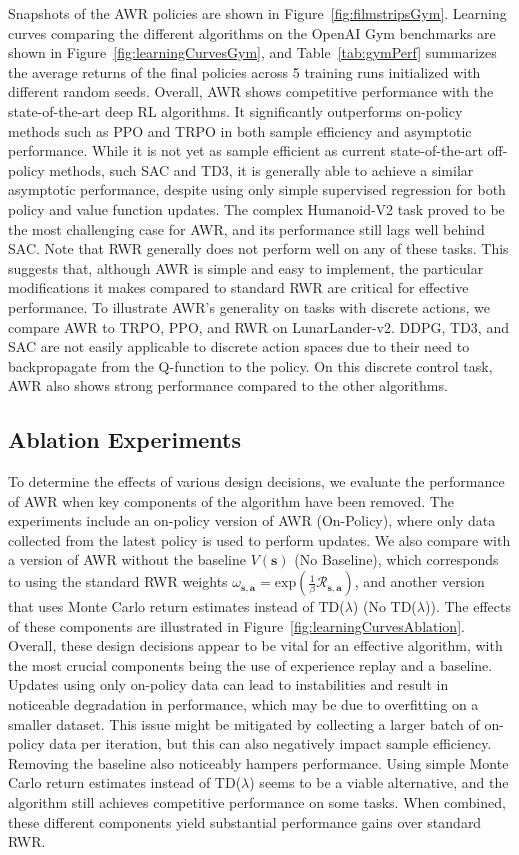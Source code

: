 Snapshots of the AWR policies are shown in Figure~\ref{fig:filmstripsGym}. Learning curves comparing the different algorithms on the OpenAI Gym benchmarks are shown in Figure~\ref{fig:learningCurvesGym}, and Table~\ref{tab:gymPerf} summarizes the average returns of the final policies across 5 training runs initialized with different random seeds. Overall, AWR shows competitive performance with the state-of-the-art deep RL algorithms. It significantly outperforms on-policy methods such as PPO and TRPO in both sample efficiency and asymptotic performance. While it is not yet as sample efficient as current state-of-the-art off-policy methods, such SAC and TD3, it is generally able to achieve a similar asymptotic performance, despite using only simple supervised regression for both policy and value function updates. The complex Humanoid-V2 task proved to be the most challenging case for AWR, and its performance still lags well behind SAC. Note that RWR generally does not perform well on any of these tasks. This suggests that, although AWR is simple and easy to implement, the particular modifications it makes compared to standard RWR are critical for effective performance. To illustrate AWR's generality on tasks with discrete actions, we compare AWR to TRPO, PPO, and RWR on LunarLander-v2. DDPG, TD3, and SAC are not easily applicable to discrete action spaces due to their need to backpropagate from the Q-function to the policy. On this discrete control task, AWR also shows strong performance compared to the other algorithms.

\subsection{Ablation Experiments} To determine the effects of various design decisions, we evaluate the performance of AWR when key components of the algorithm have been removed. The experiments include an on-policy version of AWR (On-Policy), where only data collected from the latest policy is used to perform updates. We also compare with a version of AWR without the baseline $V({\mathbf{s}})$ (No Baseline), which corresponds to using the standard RWR weights ${\omega_{{\mathbf{s}}, {\mathbf{a}}} = \mathrm{exp}(\frac{1}{\beta}\mathcal{R}_{{\mathbf{s}}, {\mathbf{a}}})}$, and another version that uses Monte Carlo return estimates instead of TD($\lambda$) (No TD($\lambda$)). The effects of these components are illustrated in Figure~\ref{fig:learningCurvesAblation}. Overall, these design decisions appear to be vital for an effective algorithm, with the most crucial components being the use of experience replay and a baseline. Updates using only on-policy data can lead to instabilities and result in noticeable degradation in performance, which may be due to overfitting on a smaller dataset. This issue might be mitigated by collecting a larger batch of on-policy data per iteration, but this can also negatively impact sample efficiency. Removing the baseline also noticeably hampers performance. Using simple Monte Carlo return estimates instead of TD($\lambda$) seems to be a viable alternative, and the algorithm still achieves competitive performance on some tasks. When combined, these different components yield substantial performance gains over standard RWR.

